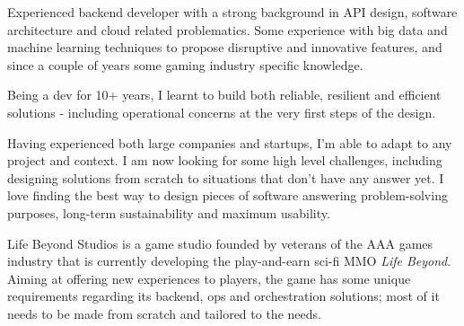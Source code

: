 \documentclass[10pt, a4paper, ragged2e]{altacv}
\begin{document}
\sloppy
{}

\begin{adjustwidth}{-3.7cm}{}
\makecvheader
\end{adjustwidth}

	Experienced backend developer with a strong background in API design, software architecture and cloud related problematics. Some experience with big data and machine learning techniques to propose disruptive and innovative features, and since a couple of years some gaming industry specific knowledge.

	\medskip
	Being a dev for 10+ years, I learnt to build both reliable, resilient and efficient solutions - including operational concerns at the very first steps of the design.

	\medskip
	Having experienced both large companies and startups, I'm able to adapt to any project and context. I am now looking for some high level challenges, including designing solutions from scratch to situations that don't have any answer yet.
	I love finding the best way to design pieces of software answering problem-solving purposes, long-term sustainability and maximum usability.


\bigskip
{}
		
		Life Beyond Studios is a game studio founded by veterans of the AAA games industry that is currently developing the play-and-earn sci-fi MMO \emph{Life Beyond}.
		Aiming at offering new experiences to players, the game has some unique requirements regarding its backend, ops and orchestration solutions; most of it needs to be made from scratch and tailored to the needs.
\end{document}
